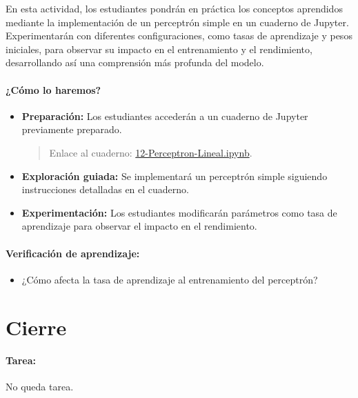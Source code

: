 \documentclass[a4,11pt]{aleph-notas}
\begin{document}
En esta actividad, los estudiantes pondrán en práctica los conceptos aprendidos mediante la implementación de un perceptrón simple en un cuaderno de Jupyter. Experimentarán con diferentes configuraciones, como tasas de aprendizaje y pesos iniciales, para observar su impacto en el entrenamiento y el rendimiento, desarrollando así una comprensión más profunda del modelo.

\paragraph{¿Cómo lo haremos?}  
\begin{itemize}[leftmargin=*]
    \item \textbf{Preparación:} Los estudiantes accederán a un cuaderno de Jupyter previamente preparado.
    \begin{quote}
        Enlace al cuaderno: \href{https://colab.research.google.com/github/andres-merino/AprendizajeAutomaticoInicial-05-N0105/blob/main/2-Notebooks12-Perceptron-Lineal.ipynb}{12-Perceptron-Lineal.ipynb}.
    \end{quote}
    \item \textbf{Exploración guiada:} Se implementará un perceptrón simple siguiendo instrucciones detalladas en el cuaderno.
    \item \textbf{Experimentación:} Los estudiantes modificarán parámetros como tasa de aprendizaje para observar el impacto en el rendimiento.
\end{itemize}

\paragraph{Verificación de aprendizaje:}  
\begin{itemize}[leftmargin=*]
    \item ¿Cómo afecta la tasa de aprendizaje al entrenamiento del perceptrón?
\end{itemize}

\section*{Cierre}

\paragraph{Tarea:}
    No queda tarea.
\end{document}

